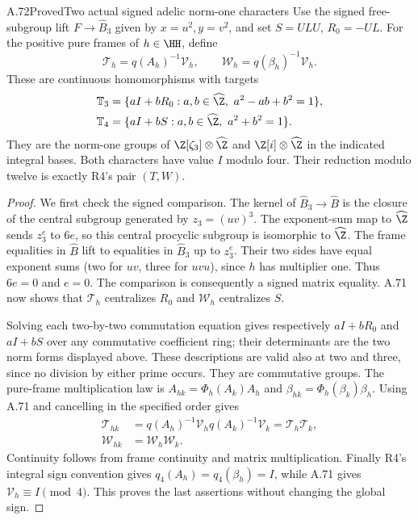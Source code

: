 \begin{statement}{A.72}{Proved}{Two actual signed adelic norm-one characters}
Use the signed free-subgroup lift $F\to\widehat B_3$ given by
$x=u^2,y=v^2$, and set $S=ULU$, $R_0=-UL$.
For the positive pure frames of $h\in\HH$, define
\[
 \mathcal T_h=q(A_h)^{-1}\mathcal V_h,\qquad
 \mathcal W_h=q(\beta_h)^{-1}\mathcal V_h.
\]
These are continuous homomorphisms with targets
\[
 \begin{split}
 \mathbb T_3&=\{aI+bR_0:a,b\in\widehat\Z,
                       \ a^2-ab+b^2=1\},\\
 \mathbb T_4&=\{aI+bS:a,b\in\widehat\Z,
                       \ a^2+b^2=1\}.
 \end{split}
\]
They are the norm-one groups of
$\Z[\zeta_3]\otimes\widehat\Z$ and
$\Z[i]\otimes\widehat\Z$ in the indicated integral bases.
Both characters have value $I$ modulo four.
Their reduction modulo twelve is exactly R4's pair $(T,W)$.
\end{statement}
\begin{proof}
We first check the signed comparison. The kernel of
$\widehat B_3\to\widehat B$ is the closure of the central
subgroup generated by $z_3=(uv)^3$. The exponent-sum map
to $\widehat\Z$ sends $z_3^e$ to $6e$, so this central
procyclic subgroup is isomorphic to $\widehat\Z$.
The frame equalities in $\widehat B$ lift to equalities in
$\widehat B_3$ up to $z_3^e$. Their two sides have equal
exponent sums (two for $uv$, three for $uvu$), since
$h$ has multiplier one. Thus $6e=0$ and $e=0$.
The comparison is consequently a signed matrix equality.
A.71 now shows that $\mathcal T_h$ centralizes $R_0$ and
$\mathcal W_h$ centralizes $S$.

Solving each two-by-two commutation equation gives respectively
$aI+bR_0$ and $aI+bS$ over any commutative coefficient ring;
their determinants are the two norm forms displayed above.
These descriptions are valid also at two and three, since
no division by either prime occurs. They are commutative groups.
The pure-frame multiplication law is
$A_{hk}=\Phi_h(A_k)A_h$ and
$\beta_{hk}=\Phi_h(\beta_k)\beta_h$.
Using A.71 and cancelling in the specified order gives
\[
 \begin{split}
 \mathcal T_{hk}
 &=q(A_h)^{-1}\mathcal V_h q(A_k)^{-1}\mathcal V_k
   =\mathcal T_h\mathcal T_k,\\
 \mathcal W_{hk}&=\mathcal W_h\mathcal W_k.
 \end{split}
\]
Continuity follows from frame continuity and matrix multiplication.
Finally R4's integral sign convention gives
$q_4(A_h)=q_4(\beta_h)=I$, while A.71 gives
$\mathcal V_h\equiv I\pmod4$. This proves the last assertions
without changing the global sign.
\end{proof}

